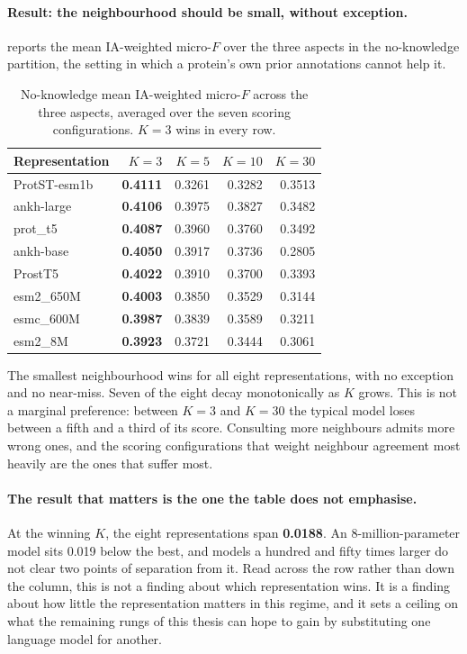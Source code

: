\paragraph{Result: the neighbourhood should be small, without exception.}
 reports the mean IA-weighted micro-$F$ over the three
aspects in the no-knowledge partition, the setting in which a protein's own prior
annotations cannot help it.

\begin{table}[htbp]
  \centering
  \caption[First PLM ablation]{No-knowledge mean IA-weighted micro-$F$ across the
  three aspects, averaged over the seven scoring configurations. $K=3$ wins in
  every row.}
  \label{tab:exp14-grid}
  \begin{tabular}{lrrrr}
    \toprule
    Representation & $K{=}3$ & $K{=}5$ & $K{=}10$ & $K{=}30$ \\
    \midrule
    ProtST-esm1b   & \textbf{0.4111} & 0.3261 & 0.3282 & 0.3513 \\
    ankh-large     & \textbf{0.4106} & 0.3975 & 0.3827 & 0.3482 \\
    prot\_t5       & \textbf{0.4087} & 0.3960 & 0.3760 & 0.3492 \\
    ankh-base      & \textbf{0.4050} & 0.3917 & 0.3736 & 0.2805 \\
    ProstT5        & \textbf{0.4022} & 0.3910 & 0.3700 & 0.3393 \\
    esm2\_650M     & \textbf{0.4003} & 0.3850 & 0.3529 & 0.3144 \\
    esmc\_600M     & \textbf{0.3987} & 0.3839 & 0.3589 & 0.3211 \\
    esm2\_8M       & \textbf{0.3923} & 0.3721 & 0.3444 & 0.3061 \\
    \bottomrule
  \end{tabular}
\end{table}

The smallest neighbourhood wins for all eight representations, with no exception
and no near-miss. Seven of the eight decay monotonically as $K$ grows. This is not
a marginal preference: between $K{=}3$ and $K{=}30$ the typical model loses
between a fifth and a third of its score. Consulting more neighbours admits more
wrong ones, and the scoring configurations that weight neighbour agreement most
heavily are the ones that suffer most.

\paragraph{The result that matters is the one the table does not emphasise.}
At the winning $K$, the eight representations span \textbf{0.0188}. An
8-million-parameter model sits 0.019 below the best, and models a hundred and
fifty times larger do not clear two points of separation from it. Read across the
row rather than down the column, this is not a finding about which representation
wins. It is a finding about how little the representation matters in this regime,
and it sets a ceiling on what the remaining rungs of this thesis can hope to gain
by substituting one language model for another.

